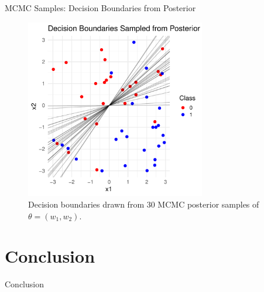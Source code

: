 \documentclass{beamer}
\begin{document}
\begin{frame}{MCMC Samples: Decision Boundaries from Posterior}
  \begin{figure}
    \centering
    \includegraphics[width=0.7\textwidth]{figures/mcmc.pdf}
    \caption{Decision boundaries drawn from 30 MCMC posterior samples of \(\theta = (w_1, w_2)\).}
  \end{figure}
\end{frame}

\section{Conclusion}

\begin{frame}{Conclusion}
\end{frame}
\end{document}
